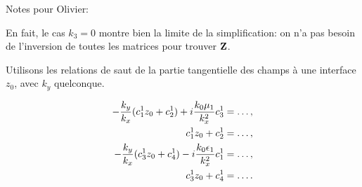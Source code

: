   {
  \begin{itshape}
  Notes pour Olivier: 

  En fait, le cas \(k_3=0\) montre bien la limite de la simplification: on n'a pas besoin de l'inversion de toutes les matrices pour trouver \(\mathbf{Z}\).




  Utilisons les relations de saut de la partie tangentielle des champs à une interface \(z_0\), avec \(k_y\) quelconque.

  \begin{align*}
  -\dfrac{k_y}{k_x}(c_1^1 z_0 + c_2^1) + i\dfrac{k_0\mu_1}{k_x^2}c_3^1 &= \dots,
  \\
  c_1^1 z_0 + c_2^1 &= \dots,
  \\
  -\dfrac{k_y}{k_x}(c_3^1 z_0 + c_4^1)-i\dfrac{k_0\epsilon_1}{k_x^2}c_1^1 &= \dots,
  \\
  c_3^1 z_0 + c_4^1 &= \dots.
  \end{align*}


\end{itshape}}
